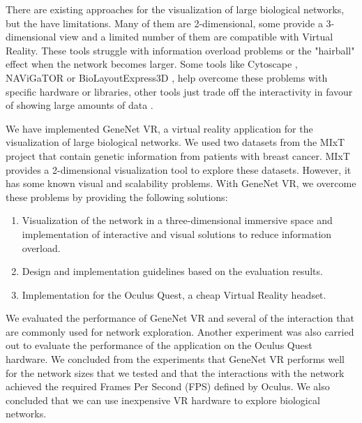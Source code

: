 
There are existing approaches for the visualization of large biological networks, but the have limitations. Many of them are 2-dimensional, some provide a 3-dimensional view and a limited number of them are compatible with Virtual Reality. These tools struggle with information overload problems or the "hairball" effect when the network becomes larger. Some tools like Cytoscape \cite{cytoscape}, NAViGaTOR \cite{navigator} or BioLayoutExpress3D \cite{biolayout3d}, help overcome these problems with specific hardware or libraries, other tools just trade off the interactivity in favour of showing large amounts of data \cite{agapito_guzzi_cannataro_2013}.




We have implemented GeneNet VR, a virtual reality application for the visualization of large biological networks. We used two datasets from the MIxT project \cite{dumeaux_fjukstad_interactions_tumor_blood} that contain genetic information from patients with breast cancer. MIxT provides a 2-dimensional visualization tool to explore these datasets. However, it has some known visual and scalability problems. With GeneNet VR, we overcome these problems by providing the following solutions:
\begin{enumerate}
  \item Visualization of the network in a three-dimensional immersive space and implementation of interactive and visual solutions to reduce information overload.
  \item Design and implementation guidelines based on the evaluation results.
  \item Implementation for the Oculus Quest, a cheap Virtual Reality headset.
\end{enumerate}

We evaluated the performance of GeneNet VR and several of the interaction that are commonly used for network exploration. Another experiment was also carried out to evaluate the performance of the application on the Oculus Quest hardware. We concluded from the experiments that GeneNet VR performs well for the network sizes that we tested and that the interactions with the network achieved the required Frames Per Second (FPS) defined by Oculus. We also concluded that we can use inexpensive VR hardware to explore biological networks.


